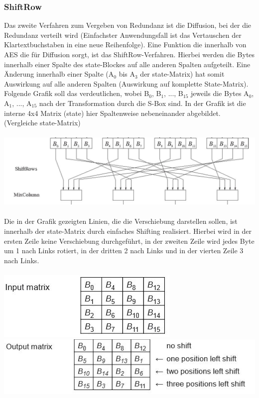 \documentclass[10pt, a4paper]{scrreprt}
\begin{document}
\subsubsection{ShiftRow}
Das zweite Verfahren zum Vergeben von Redundanz ist die Diffusion, bei der die Redundanz verteilt wird (Einfachster Anwendungsfall ist das Vertauschen der Klartextbuchstaben in eine neue Reihenfolge). Eine Funktion die innerhalb von AES die für Diffusion sorgt, ist das ShiftRow-Verfahren. Hierbei werden die Bytes innerhalb einer Spalte des state-Blockes auf alle anderen Spalten aufgeteilt. Eine Änderung innerhalb einer Spalte (A$_{0}$ bis A$_{3}$ der state-Matrix) hat somit Auswirkung auf alle anderen Spalten (Auswirkung auf komplette State-Matrix). Folgende Grafik soll das verdeutlichen, wobei B$_{0}$, B$_{1}$, ..., B$_{15}$ jeweils die Bytes A$_{0}$, A$_{1}$, ..., A$_{15}$ nach der Transformation durch die S-Box sind. In der Grafik ist die interne 4x4 Matrix (state) hier Spaltenweise nebeneinander abgebildet. (Vergleiche state-Matrix)  \\ \\%
\includegraphics[scale=0.5]{aes_Shift_Row.JPG} \\ \\
Die in der Grafik gezeigten Linien, die die Verschiebung darstellen sollen, ist innerhalb der state-Matrix durch einfaches Shifting realisiert. Hierbei wird in der ersten Zeile keine Verschiebung durchgeführt, in der zweiten Zeile wird jedes Byte um 1 nach Links rotiert, in der dritten 2 nach Links und in der vierten Zeile 3 nach Links. \\ \\
\includegraphics[scale=0.5]{shift_row_before.JPG}
\includegraphics[scale=0.5]{shift_row_after.JPG} \\
\end{document}
